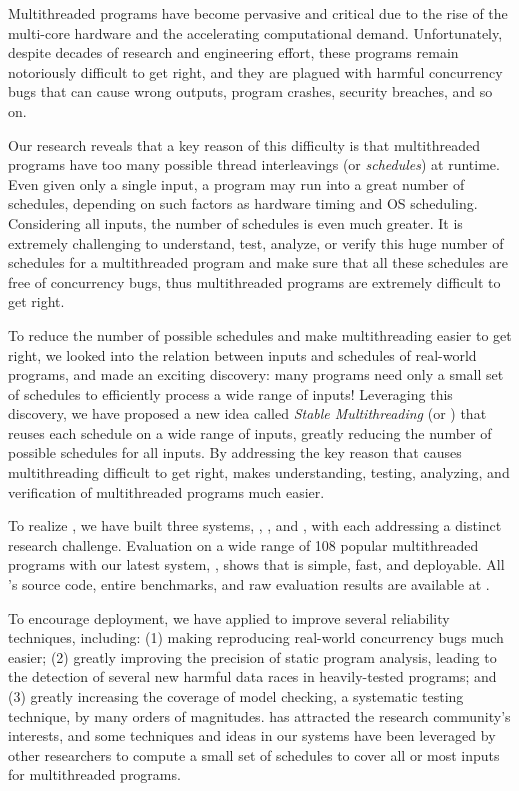 Multithreaded programs have become pervasive and critical due to the rise of the
multi-core hardware and the accelerating computational demand.
Unfortunately, despite decades of research and engineering effort, these
programs remain notoriously difficult to get right, and they are plagued with
harmful concurrency bugs that can cause wrong outputs, program crashes, security
breaches, and so on.

Our research reveals that a key reason of this difficulty is
that multithreaded programs have too many possible thread interleavings (or
\emph{schedules}) at runtime. Even given only a single input, a program may run 
into a great number of schedules, depending on such factors as hardware timing 
and OS scheduling. Considering all inputs, the number of schedules is even much 
greater. It is extremely challenging to understand, test, analyze, or verify 
this huge number of schedules for a multithreaded program and make sure that 
all these schedules are free of concurrency bugs, thus multithreaded programs 
are extremely difficult to get right.

To reduce the number of possible schedules and make multithreading
easier to get right, we looked into the relation between inputs and schedules 
of real-world programs, and made an exciting discovery: many programs need only 
a small set of schedules to efficiently process a wide range of inputs! 
Leveraging this discovery, we have proposed a new idea called \emph{Stable 
Multithreading} (or \emph{\smt}) that reuses each schedule on a wide range of 
inputs, greatly reducing the number of possible schedules for all inputs. By 
addressing the key reason that causes multithreading difficult to get right, 
\smt makes understanding, testing, analyzing, and verification of 
multithreaded programs much easier.

To realize \smt, we have built three \smt systems, \tern, \peregrine, and 
\parrot, with each addressing a distinct research challenge. Evaluation on a 
wide range of 108 popular multithreaded programs with our latest \smt system, 
\parrot, shows that \smt is simple, fast, and deployable. All \parrot's source 
code, entire benchmarks, and raw evaluation results are available at \github.

To encourage deployment, we have applied \smt to improve several reliability 
techniques, including: (1) making reproducing real-world concurrency bugs much 
easier;  (2) greatly improving the precision of static program analysis, 
leading to the detection of several new harmful data races in heavily-tested 
programs; and (3) greatly increasing the coverage of model checking, a 
systematic testing technique, by many orders of magnitudes. \smt has attracted 
the research community's interests, and some techniques and ideas in our \smt 
systems have been leveraged by other researchers to compute a small set of 
schedules to cover all or most inputs for multithreaded programs.

% 
